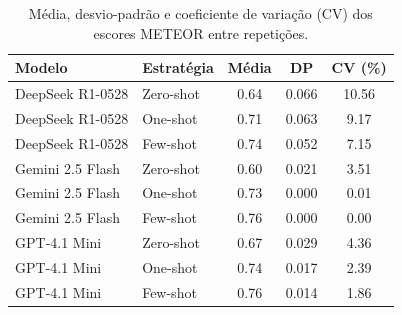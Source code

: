 \begin{table}[ht]
\centering
\caption{Média, desvio-padrão e coeficiente de variação (CV) dos escores METEOR entre repetições.}
\label{tab:variabilidade}
\begin{tabular}{llccc}
\hline
\textbf{Modelo} & \textbf{Estratégia} & \textbf{Média} & \textbf{DP} & \textbf{CV (\%)} \\
\hline
DeepSeek R1-0528 & Zero-shot & 0.64 & 0.066 & 10.56 \\
DeepSeek R1-0528 & One-shot & 0.71 & 0.063 & 9.17 \\
DeepSeek R1-0528 & Few-shot & 0.74 & 0.052 & 7.15 \\
Gemini 2.5 Flash & Zero-shot & 0.60 & 0.021 & 3.51 \\
Gemini 2.5 Flash & One-shot & 0.73 & 0.000 & 0.01 \\
Gemini 2.5 Flash & Few-shot & 0.76 & 0.000 & 0.00 \\
GPT-4.1 Mini & Zero-shot & 0.67 & 0.029 & 4.36 \\
GPT-4.1 Mini & One-shot & 0.74 & 0.017 & 2.39 \\
GPT-4.1 Mini & Few-shot & 0.76 & 0.014 & 1.86 \\
\hline
\end{tabular}
\end{table}
